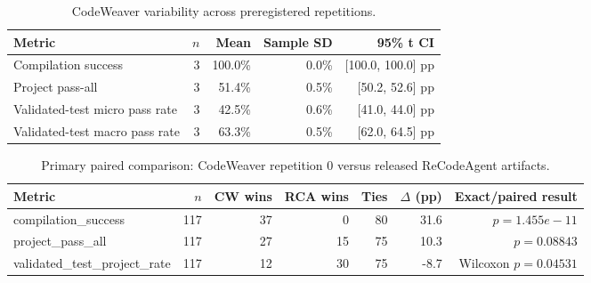 \begin{table}[t]
\centering
\caption{CodeWeaver variability across preregistered repetitions.}
\begin{tabular}{lrrrr}
\toprule
Metric & $n$ & Mean & Sample SD & 95\% t CI \\
\midrule
Compilation success & 3 & 100.0\% & 0.0\% & [100.0, 100.0] pp \\
Project pass-all & 3 & 51.4\% & 0.5\% & [50.2, 52.6] pp \\
Validated-test micro pass rate & 3 & 42.5\% & 0.6\% & [41.0, 44.0] pp \\
Validated-test macro pass rate & 3 & 63.3\% & 0.5\% & [62.0, 64.5] pp \\
\bottomrule
\end{tabular}
\label{tab:codeweaver-variability}
\end{table}

\begin{table}[t]
\centering
\caption{Primary paired comparison: CodeWeaver repetition 0 versus released ReCodeAgent artifacts.}
\begin{tabular}{lrrrrrr}
\toprule
Metric & $n$ & CW wins & RCA wins & Ties & $\Delta$ (pp) & Exact/paired result \\
\midrule
compilation\_success & 117 & 37 & 0 & 80 & 31.6 & $p=1.455e-11$ \\
project\_pass\_all & 117 & 27 & 15 & 75 & 10.3 & $p=0.08843$ \\
validated\_test\_project\_rate & 117 & 12 & 30 & 75 & -8.7 & Wilcoxon $p=0.04531$ \\
\bottomrule
\end{tabular}
\label{tab:primary-paired}
\end{table}

